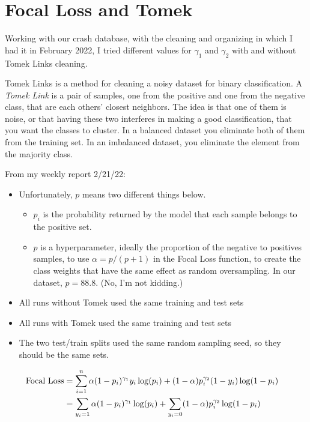 \section{Focal Loss and Tomek}

Working with our crash database, with the cleaning and organizing in which I had it in February 2022, I tried different values for $\gamma_1$ and $\gamma_2$ with and without Tomek Links cleaning.  

Tomek Links is a method for cleaning a noisy dataset for binary classification.  A {\it Tomek Link} is a pair of samples, one from the positive and one from the negative class, that are each others' closest neighbors.  The idea is that one of them is noise, or that having these two interferes in making a good classification, that you want the classes to cluster.  In a balanced dataset you eliminate both of them from the training set.  In an imbalanced dataset, you eliminate the element from the majority class.  

From my weekly report 2/21/22:

\begin{itemize}
	\item Unfortunately, $p$ means two different things below.  
	\begin{itemize}
		\item $p_i$ is the probability returned by the model that each sample belongs to the positive set.
		\item $p$ is a hyperparameter, ideally the proportion of the negative to positives samples, to use $\alpha = p/(p+1)$ in the Focal Loss function, to create the class weights that have the same effect as random oversampling.  In our dataset, $p=88.8$.  (No, I'm not kidding.)
	\end{itemize}
	\item All runs without Tomek used the same training and test sets
	\item All runs with Tomek used the same training and test sets
	\item The two test/train splits used the same random sampling seed, so they should be the same sets.
\end{itemize}


\begin{align*}
	\text{Focal Loss} &= \sum_{i=1}^n \alpha (1 - p_i) ^{\gamma_1} y_i \log (p_i) + (1 - \alpha) p_i^{\gamma_2} (1 - y_i)  \log (1 - p_i) \cr
	 &= \sum_{y_i=1} \alpha (1 - p_i) ^{\gamma_1} \log (p_i) + \sum_{y_i=0} (1 - \alpha) p_i^{\gamma_2}   \log (1 - p_i) \cr
	\end{align*}

